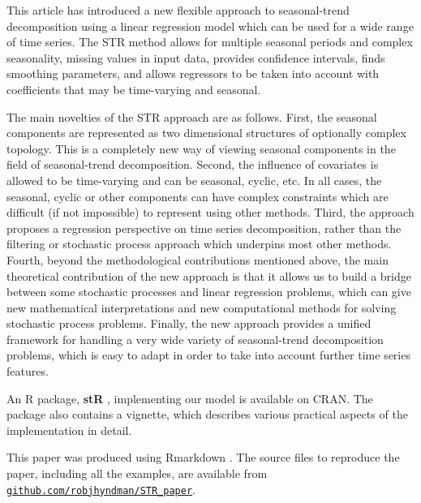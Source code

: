 \documentclass[11pt,a4paper,]{article}
\begin{document}
This article has introduced a new flexible approach to seasonal-trend decomposition using a linear regression model which can be used for a wide range of time series. The STR method allows for multiple seasonal periods and complex seasonality, missing values in input data, provides confidence intervals, finds smoothing parameters, and allows regressors to be taken into account with coefficients that may be time-varying and seasonal.

The main novelties of the STR approach are as follows. First, the seasonal components are represented as two dimensional structures of optionally complex topology. This is a completely new way of viewing seasonal components in the field of seasonal-trend decomposition. Second, the influence of covariates is allowed to be time-varying and can be seasonal, cyclic, etc. In all cases, the seasonal, cyclic or other components can have complex constraints which are difficult (if not impossible) to represent using other methods. Third, the approach proposes a regression perspective on time series decomposition, rather than the filtering or stochastic process approach which underpins most other methods. Fourth, beyond the methodological contributions mentioned above, the main theoretical contribution of the new approach is that it allows us to build a bridge between some stochastic processes and linear regression problems, which can give new mathematical interpretations and new computational methods for solving stochastic process problems. Finally, the new approach provides a unified framework for handling a very wide variety of seasonal-trend decomposition problems, which is easy to adapt in order to take into account further time series features.

An R package, \textbf{stR} \autocite{stR}, implementing our model is available on CRAN.
The package also contains a vignette, which describes various practical aspects of the implementation in detail.

This paper was produced using Rmarkdown \autocite{rmarkdown}. The source files to reproduce the paper, including all the examples, are available from \href{https://github.com/robjhyndman/STR_paper}{\texttt{github.com/robjhyndman/STR\_paper}}.

\newpage

\printbibliography


\end{document}
